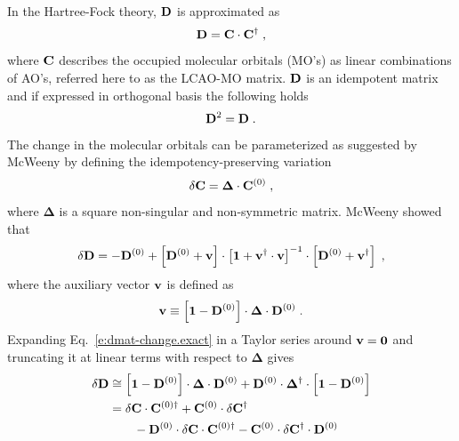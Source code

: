 \documentclass[aip,amsmath,amssymb,reprint,floatfix]{revtex4-1}
\newcommand{\BM}[1]{\bm{#1}}
\begin{document}
In the Hartree\hyp{}Fock theory,\cite{Roothaan.RevModPhys.1951} ${\bf D}$ is approximated as
%
\begin{equation}
 {\bf D} = {\bf C} \cdot {\bf C}^\dagger \;,
\end{equation}
%
where ${\bf C}$ describes the occupied molecular orbitals (MO's) as linear combinations
of AO's, referred here to as the LCAO-MO matrix.
${\bf D}$ is an idempotent matrix and if expressed in orthogonal basis the following holds
%
\begin{equation}
 {\bf D}^2 = {\bf D} \;.
\end{equation}
%
The change in the molecular orbitals can be parameterized as suggested by McWeeny\cite{McWeeny.RevModPhys.1960}
by defining the idempotency\hyp{}preserving variation
%
\begin{equation}
 \delta {\bf C} = {\BM\Delta} \cdot {\bf C}^{(0)} \;,
\end{equation}
%
where $\BM\Delta$ is a square non\hyp{}singular and non\hyp{}symmetric matrix.
McWeeny showed that
%
\begin{equation} \label{e:dmat-change.exact}
 \delta {\bf D} = -{\bf D}^{(0)} + \left[ {\bf D}^{(0)} + {\bf v} \right] \cdot
                                   \left[ {\bf 1} + {\bf v}^\dagger \cdot {\bf v} \right]^{-1} \cdot
                                   \left[ {\bf D}^{(0)} + {\bf v}^\dagger \right] \;,
\end{equation}
%
where the auxiliary vector ${\bf v}$ is defined as
%
\begin{equation}
 {\bf v} \equiv \left[ {\bf 1} - {\bf D}^{(0)} \right] \cdot {\BM\Delta} \cdot {\bf D}^{(0)}  \;.
\end{equation}
%
Expanding Eq.~\eqref{e:dmat-change.exact} in a Taylor series around ${\bf v}={\bf 0}$ and
truncating it at linear terms with respect to ${\BM\Delta}$ gives
%
\begin{subequations} 
 \begin{align}
 \delta {\bf D} &\cong \left[ {\bf 1} - {\bf D}^{(0)} \right] \cdot {\BM\Delta} \cdot {\bf D}^{(0)} + 
                        {\bf D}^{(0)} \cdot {\BM\Delta}^\dagger \cdot \left[ {\bf 1} - {\bf D}^{(0)} \right]  
 \label{e:dD-1} \\  &= 
  \delta {\bf C} \cdot {\bf C}^{(0)\dagger} + {\bf C}^{(0)} \cdot \delta {\bf C}^\dagger \nonumber \\
           &\qquad - {\bf D}^{(0)} \cdot \delta {\bf C} \cdot {\bf C}^{{(0)}\dagger} 
                   - {\bf C}^{(0)} \cdot \delta {\bf C}^\dagger \cdot {\bf D}^{(0)} 
 \label{e:dD-2}
 \end{align}
\end{subequations}
\end{document}

